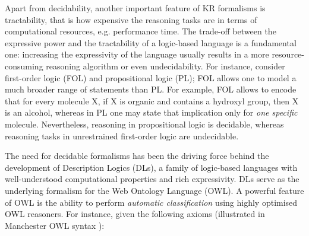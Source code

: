\documentclass[10pt]{bmc_article}
\newenvironment{bmcformat}{\baselineskip20pt\sloppy\setboolean{publ}{false}}{\baselineskip20pt\sloppy}
\begin{document}
\begin{bmcformat}
Apart from decidability, another important feature of KR formalisms is tractability, that is how expensive the reasoning tasks are in terms of computational resources, e.g. performance time. The trade-off between the expressive power and the tractability of a logic-based language is a fundamental one: increasing the expressivity of the language usually results in a more resource-consuming reasoning algorithm or even undecidability. For instance, consider first-order logic (FOL) and propositional logic (PL); FOL allows one to model a much broader range of statements than PL. For example, FOL allows to encode that for every molecule X, if X is organic and contains a hydroxyl group, then X is an alcohol, whereas in PL one may state that implication only for \emph{one specific} molecule. Nevertheless, reasoning in propositional logic is decidable, whereas reasoning tasks in unrestrained first-order logic are undecidable.

The need for decidable formalisms has been the driving force behind the development of Description Logics (DLs), a family of logic-based languages with well-understood computational properties and rich expressivity. DLs serve as the underlying formalism for the Web Ontology Language (OWL). %
A powerful feature of OWL is the ability to perform \emph{automatic classification} using highly optimised OWL reasoners. For instance, given the following axioms (illustrated in Manchester OWL syntax \cite{horridgems2009}):


\end{bmcformat}
\end{document}
